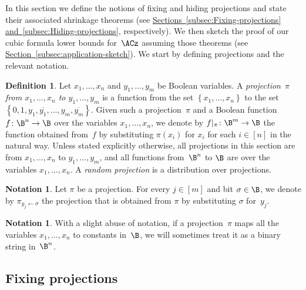 \documentclass[11pt]{article}
\numberwithin{equation}{section}
\theoremstyle{definition}
\newtheorem{definition}[theorem]{Definition}
\theoremstyle{plain}
\newcommand{\expref}[2]{\hyperref[#2]{#1~\ref{#2}}}
\theoremstyle{definition}\newtheorem{notation}[theorem]{Notation}\theoremstyle{plain}
\begin{document}
In this section we define the notions of fixing and hiding projections
and state their associated shrinkage theorems
(see \expref{Sections}{subsec:Fixing-projections}
\expref{and}{subsec:Hiding-projections}, %
respectively). We then sketch the proof of our cubic formula lower
bounds for~$\ACz$ assuming those theorems (see \expref{Section}{subsec:application-sketch}).
We start by defining projections and the relevant notation.
\begin{definition}
Let $x_{1},\ldots,x_{n}$ and $y_{1},\ldots,y_{m}$ be Boolean variables.
A \emph{projection}~$\pi$ \emph{from $x_{1},\ldots,x_{n}$ to $y_{1},\ldots,y_{m}$}
is a function from the set $\left\{ x_{1},\ldots,x_{n}\right\} $
to the set $\left\{ 0,1,y_{1},\overline{y_{1}},\ldots,y_{m},\overline{y_{m}}\right\} $.
Given such a projection~$\pi$ and a Boolean function~$f\colon\B^{n}\to\B$
over the variables $x_{1},\ldots,x_{n}$, we denote by $f|_{\pi}\colon\B^{m}\to\B$
the function obtained from~$f$ by substituting $\pi(x_{i})$ for
$x_{i}$ for each $i\in\left[n\right]$ in the natural way. Unless
stated explicitly otherwise, all projections in this section are from
\emph{$x_{1},\ldots,x_{n}$} to $y_{1},\ldots,y_{m}$, and all functions
from~$\B^{n}$ to $\B$ are over the variables $x_{1},\ldots,x_{n}$.
A \emph{random projection} is a distribution over projections. 
\end{definition}

\begin{notation}
Let $\pi$ be a projection. For every $j\in[m]$ and bit $\sigma\in\B$,
we denote by $\pi_{y_{j}\gets\sigma}$ the projection that is obtained
from $\pi$ by substituting $\sigma$ for~$y_{j}$. 
\end{notation}

\begin{notation}
With a slight abuse of notation, if a projection~$\pi$ maps all
the variables $x_{1},\ldots,x_{n}$ to constants in~$\B$, we will
sometimes treat it as a binary string in~$\B^{n}$. 
\end{notation}


\subsection{\label{subsec:Fixing-projections}Fixing projections}
\end{document}
